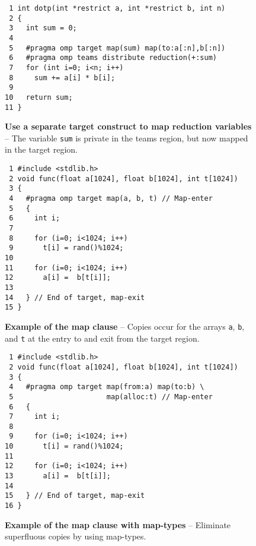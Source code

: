 \begin{figure*}[!tbh]
\begin{verbatim}
 1 int dotp(int *restrict a, int *restrict b, int n)
 2 {
 3   int sum = 0;
 4 
 5   #pragma omp target map(sum) map(to:a[:n],b[:n])
 6   #pragma omp teams distribute reduction(+:sum)
 7   for (int i=0; i<n; i++)
 8     sum += a[i] * b[i];
 9 
10   return sum;
11 }
\end{verbatim}
\caption{ \textbf {Use a separate target construct to map reduction variables} -- \small
          The variable \texttt{sum} is private in the teams region, but now mapped
          in the target region.
        }
\label{figure:chapter6-targetteams-reduction-v2}
\end{figure*}


\begin{figure*}[!b]
\begin{verbatim}
 1 #include <stdlib.h>
 2 void func(float a[1024], float b[1024], int t[1024])
 3 {
 4   #pragma omp target map(a, b, t) // Map-enter
 5   {
 6     int i;
 7 
 8     for (i=0; i<1024; i++)
 9       t[i] = rand()%1024;
10 
11     for (i=0; i<1024; i++)
12       a[i] =  b[t[i]];
13 
14   } // End of target, map-exit
15 }
\end{verbatim}
\caption{ \textbf {Example of the map clause} -- \small
          Copies occur for the arrays \texttt{a}, \texttt{b}, and 
          \texttt{t} at the entry to and exit from the target region.
         }
\label{figure:chapter6-map-v1}
\end{figure*}


\begin{figure*}[!tb]
\begin{verbatim}
 1 #include <stdlib.h>
 2 void func(float a[1024], float b[1024], int t[1024])
 3 {
 4   #pragma omp target map(from:a) map(to:b) \
 5                      map(alloc:t) // Map-enter
 6   {
 7     int i;
 8 
 9     for (i=0; i<1024; i++)
10       t[i] = rand()%1024;
11 
12     for (i=0; i<1024; i++)
13       a[i] =  b[t[i]];
14 
15   } // End of target, map-exit
16 }
\end{verbatim}
\caption{ \textbf {Example of the map clause with map-types} -- \small
          Eliminate superfluous copies by using map-types.
         }
\label{figure:chapter6-map-v2}
\end{figure*}


